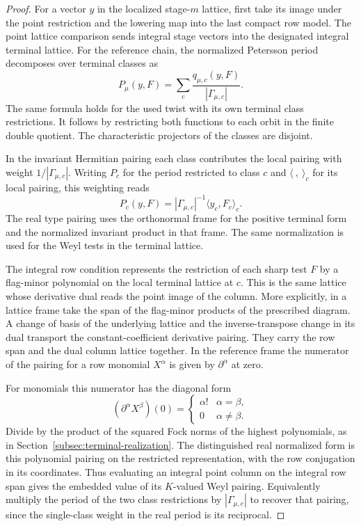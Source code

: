 \begin{proof}
For a vector \(y\) in the localized stage-\(m\) lattice,
first take its image under the point restriction and the
lowering map into the last compact row model. The point
lattice comparison sends integral stage vectors into the
designated integral terminal lattice. For the reference
chain, the normalized Petersson period decomposes over
terminal classes as
\begin{equation}\label{eq:terminal-period-valuation}
     P_\mu(y,F)=
         \sum_{c}\frac{q_{\mu,c}(y,F)}{|\Gamma_{\mu,c}|}.
\end{equation}
The same formula holds for the used twist with its own
terminal class restrictions. It follows by restricting
both functions to each orbit in the finite double quotient.
The characteristic projectors of the classes are disjoint.

In the invariant Hermitian pairing each class contributes
the local pairing with weight \(1/|\Gamma_{\mu,c}|\).
Writing \(P_c\) for the period restricted to class \(c\) and \(\langle\ ,\ \rangle_c\) for its local pairing, this weighting reads
\[
  P_c(y,F)=|\Gamma_{\mu,c}|^{-1}\langle y_c,F_c\rangle_c .
\]
The real type pairing uses the orthonormal frame for the
positive terminal form and the normalized invariant product
in that frame. The same normalization is used for the
Weyl tests in the terminal lattice.

The integral row condition represents the restriction of
each sharp test \(F\) by a flag-minor polynomial on the
local terminal lattice at \(c\). This is the same lattice
whose derivative dual reads the point image of the
column. More explicitly, in a lattice frame take the
span of the flag-minor products of the prescribed diagram.
A change of basis of the underlying lattice and the
inverse-transpose change in its dual transport the
constant-coefficient derivative pairing. They carry
the row span and the dual column lattice together.
In the reference frame the numerator of the pairing for a row monomial \(X^\alpha\)
is given by \(\partial^\alpha\) at zero.

For monomials this numerator has the diagonal form
\[
  (\partial^\alpha X^\beta)(0)=\begin{cases}\alpha!&\alpha=\beta,\\0&\alpha\ne\beta.\end{cases}
\]
 Divide by the product
of the squared Fock norms of the highest polynomials, as in
Section~\ref{subsec:terminal-realization}. The distinguished
real normalized form is this polynomial pairing on the
restricted representation, with the row conjugation in
its coordinates. Thus evaluating an integral point
column on the integral row span gives the embedded
value of its \(K\)-valued Weyl pairing. Equivalently
multiply the period of the two class restrictions by
\(|\Gamma_{\mu,c}|\) to recover that pairing, since the
single-class weight in the real period is its reciprocal.


\end{proof}
